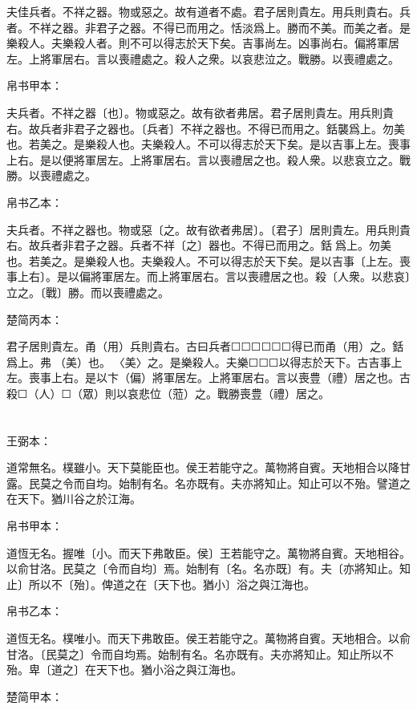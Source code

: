 \documentclass[a5paper]{ctexbook}
\begin{document}
    夫佳兵者。不祥之器。物或惡之。故有道者不處。君子居則貴左。用兵則貴右。兵者。不祥之器。非君子之器。不得已而用之。恬淡爲上。勝而不美。而美之者。是樂殺人。夫樂殺人者。則不可以得志於天下矣。吉事尚左。凶事尚右。偏將軍居左。上將軍居右。言以喪禮處之。殺人之衆。以哀悲泣之。戰勝。以喪禮處之。

    
    帛书甲本：

    夫兵者。不祥之器〔也〕。物或惡之。故有欲者弗居。君子居則貴左。用兵則貴右。故兵者非君子之器也。〔兵者〕不祥之器也。不得已而用之。銛襲爲上。勿美也。若美之。是樂殺人也。夫樂殺人。不可以得志於天下矣。是以吉事上左。喪事上右。是以便將軍居左。上將軍居右。言以喪禮居之也。殺人衆。以悲哀立之。戰勝。以喪禮處之。

    帛书乙本：

    夫兵者。不祥之器也。物或惡〔之。故有欲者弗居〕。〔君子〕居則貴左。用兵則貴右。故兵者非君子之器。兵者不祥〔之〕器也。不得已而用之。銛𢤱爲上。勿美也。若美之。是樂殺人也。夫樂殺人。不可以得志於天下矣。是以吉事〔上左。喪事上右〕。是以偏將軍居左。而上將軍居右。言以喪禮居之也。殺〔人衆。以悲哀〕立之。〔戰〕勝。而以喪禮處之。

    楚简丙本：

    君子居則貴左。甬（用）兵則貴右。古曰兵者☐☐☐☐☐☐得已而甬（用）之。銛󶵩爲上。弗󶴴（美）也。󶵪〈美〉之。是樂殺人。夫樂☐☐☐以得志於天下。古吉事上左。喪事上右。是以卞（偏）將軍居左。上將軍居右。言以喪豊（禮）居之也。古殺☐（人）☐（眾）則以哀悲位（蒞）之。戰勝喪豊（禮）居之。

    \chapter{}
    王弼本：

    道常無名。樸雖小。天下莫能臣也。侯王若能守之。萬物將自賓。天地相合以降甘露。民莫之令而自均。始制有名。名亦既有。夫亦將知止。知止可以不殆。譬道之在天下。猶川谷之於江海。

    
    帛书甲本：

    道恆无名。握唯〔小。而天下弗敢臣。侯〕王若能守之。萬物將自賓。天地相谷。以俞甘洛。民莫之〔令而自均〕焉。始制有〔名。名亦既〕有。夫〔亦將知止。知止〕所以不〔殆〕。俾道之在〔天下也。猶小〕浴之與江海也。

    帛书乙本：

    道恆无名。樸唯小。而天下弗敢臣。侯王若能守之。萬物將自賓。天地相合。以俞甘洛。〔民莫之〕令而自均焉。始制有名。名亦既有。夫亦將知止。知止所以不殆。卑〔道之〕在天下也。猶小浴之與江海也。

    楚简甲本：
\end{document}
